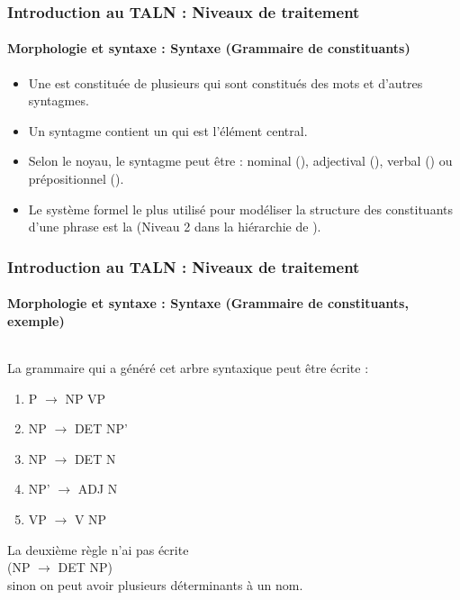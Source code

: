 \documentclass[xcolor=table]{beamer}
\begin{document}
\begin{frame}
\frametitle{Introduction au TALN : Niveaux de traitement}
\framesubtitle{Morphologie et syntaxe : Syntaxe (Grammaire de constituants)}

\begin{itemize}
	\item Une  est constituée de plusieurs  qui sont constitués des mots et d'autres syntagmes.
	\item Un syntagme contient un  qui est l'élément central.
	\item Selon le noyau, le syntagme peut être : nominal (), adjectival (), verbal () ou prépositionnel ().
	\item Le système formel le plus utilisé pour modéliser la structure des constituants d'une phrase est la  (Niveau 2 dans la hiérarchie de ).
\end{itemize}


\end{frame}


\begin{frame}
\frametitle{Introduction au TALN : Niveaux de traitement}
\framesubtitle{Morphologie et syntaxe : Syntaxe (Grammaire de constituants, exemple)}

\begin{columns}
	\begin{column}{0.52\textwidth}
	La grammaire qui a généré cet arbre syntaxique peut être écrite : 
	
	\begin{enumerate}
		\item P $ \rightarrow $ NP VP
		\item NP $ \rightarrow $ DET NP'
		\item NP $ \rightarrow $ DET N
		\item NP' $ \rightarrow $ ADJ N
		\item VP $ \rightarrow $ V NP
	\end{enumerate}

	La deuxième règle n'ai pas écrite \\(NP $ \rightarrow $ DET NP)\\ sinon on peut avoir plusieurs déterminants à un nom.
	
	\end{column}
	\begin{column}{0.42\textwidth}
	\end{column}%
\end{columns}


\end{frame}
\end{document}
